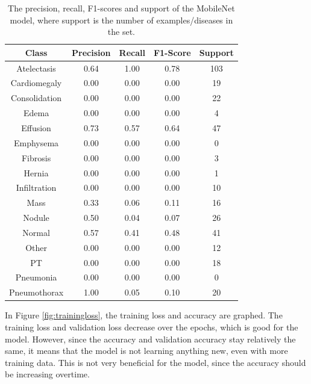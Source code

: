 \documentclass{article}
\theoremstyle{plain}
\theoremstyle{definition}
\theoremstyle{remark}
\begin{document}
\begin{table}[!h]
    \centering
    \begin{tabular}{ c  c  c  c  c }
        \hline
        \textbf{Class} & \textbf{Precision} & \textbf{Recall} & \textbf{F1-Score} & \textbf{Support}\\
        \hline
        Atelectasis & 0.64 & 1.00 & 0.78 & 103 \\
        Cardiomegaly & 0.00 & 0.00 & 0.00 & 19 \\
        Consolidation & 0.00 & 0.00 & 0.00 & 22 \\
        Edema & 0.00 & 0.00 & 0.00 & 4 \\
        Effusion & 0.73 & 0.57 & 0.64 & 47 \\
        Emphysema & 0.00 & 0.00 & 0.00 & 0 \\
        Fibrosis & 0.00 & 0.00 & 0.00 & 3 \\
        Hernia & 0.00 & 0.00 & 0.00 & 1 \\
        Infiltration & 0.00 & 0.00 & 0.00 & 10 \\
        Mass & 0.33 & 0.06 & 0.11 & 16 \\
        Nodule & 0.50 & 0.04 & 0.07 & 26 \\
        Normal & 0.57 & 0.41 & 0.48 & 41 \\
        Other & 0.00 & 0.00 & 0.00 & 12 \\
        PT & 0.00 & 0.00 & 0.00 & 18 \\
        Pneumonia & 0.00 & 0.00 & 0.00 & 0 \\
        Pneumothorax & 1.00 & 0.05 & 0.10 & 20 \\
        \hline
    \end{tabular}
    \caption{The precision, recall, F1-scores and support of the MobileNet model, where support is
    the number of examples/diseases in the set.}
    \label{table:mobilenetaccuracy}
\end{table}

In Figure \ref{fig:trainingloss}, the training loss and accuracy are graphed. The training loss and
validation loss decrease over the epochs, which is good for the model. However, since the accuracy
and validation accuracy stay relatively the same, it means that the model is not learning anything
new, even with more training data. This is not very beneficial for the model, since the accuracy
should be increasing overtime. 
\end{document}
